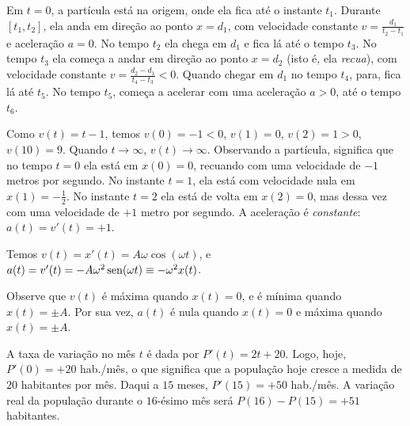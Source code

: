 \begin{Solution}{6.33}
  Em $t=0$, a partícula está na origem, onde ela fica até o instante
$t_1$. Durante $[t_1,t_2]$, ela anda em direção ao ponto $x=d_1$, com
velocidade constante $v=\frac{d_1}{t_2-t_1}$ e aceleração $a=0$. No tempo $t_2$
ela chega em $d_1$
e fica lá até o tempo $t_3$. No tempo $t_3$ ela começa a andar em direção ao
ponto $x=d_2$ (isto é, ela \emph{recua}), com velocidade constante
$v=\frac{d_2-d_1}{t_4-t_3}<0$. Quando chegar em $d_1$ no tempo $t_4$, para, fica
lá até $t_5$. No tempo $t_5$, começa a acelerar com uma aceleração $a>0$, até
o tempo $t_6$.
\end{Solution}
\begin{Solution}{6.34}
Como $v(t)=t-1$, temos $v(0)=-1<0$, $v(1)=0$, $v(2)=1>0$, $v(10)=9$.
Quando $t\to \infty$, $v(t)\to\infty$.
Observando a partícula, significa que no tempo $t=0$ ela está em
$x(0)=0$, recuando com uma velocidade de $-1$ metros por segundo. No instante
$t=1$, ela está com velocidade nula em $x(1)=-\frac12$. No instante $t=2$ ela
está de volta em $x(2)=0$, mas dessa vez com uma velocidade de $+1$ metro por
segundo.
A aceleração é \emph{constante}: $a(t)=v'(t)=+1$.
\end{Solution}
\begin{Solution}{6.35}
Temos $v(t)=x'(t)=A\omega \cos(\omega t)$, e $a(t)=v'(t)=-A\omega^2\operatorname{sen} (\omega
t)\equiv -\omega^2 x(t)$.
\begin{center}
\begin{bmlimage}\end{bmlimage}
\end{center}
Observe que $v(t)$ é máxima quando $x(t)=0$, e é mínima quando $x(t)=\pm A$.
Por sua vez, $a(t)$ é nula quando $x(t)=0$ e máxima quando $x(t)=\pm A$.
\end{Solution}
\begin{Solution}{6.36}
A taxa de variação no mês $t$ é dada por $P'(t)=2t+20$. Logo, hoje,
$P'(0)=+20$ hab./mês, o que significa que a população hoje cresce a medida de
$20$ habitantes por mês. Daqui a $15$ meses, $P'(15)=+50$ hab./mês. A
variação real da população durante o $16$-ésimo mês será $P(16)-P(15)=+51$
habitantes.
\end{Solution}
